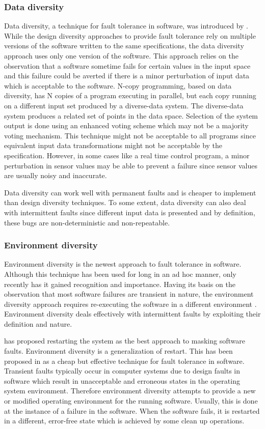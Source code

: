 \documentclass[a4paper, 11pt]{article}
\begin{document}
\subsubsection{Data diversity}
Data diversity, a technique for fault tolerance in software, was introduced by \citet{ammann1988data}. While the design diversity approaches to provide fault tolerance rely on multiple versions of the software written to the same specifications, the data diversity approach uses only one version of the software. This approach relies on the observation that a software sometime fails for certain values in the input space and this failure could be averted if there is a minor perturbation of input data which is acceptable to the software. N-copy programming, based on data diversity, has N copies of a program executing in parallel, but each copy running on a different input set produced by a diverse-data system. The diverse-data system produces a related set of points in the data space. Selection of the system output is done using an enhanced voting scheme which may not be a majority voting mechanism. This technique might not be acceptable to all programs since equivalent input data transformations might not be acceptable by the specification. However, in some cases like a real time control program, a minor perturbation in sensor values may be able to prevent a failure since sensor values are usually noisy and inaccurate.

Data diversity can work well with permanent faults and is cheaper to implement than design diversity techniques. To some extent, data diversity can also deal with intermittent faults since different input data is presented and by definition, these bugs are non-deterministic and non-repeatable.

\subsubsection{Environment diversity}
\label{sec:envdiv}
Environment diversity is the newest approach to fault tolerance in software. Although this technique has been used for long in an ad hoc manner, only recently has it gained recognition and importance. Having its basis on the observation that most software failures are transient in nature, the environment diversity approach requires re-executing the software in a different environment \citep{jalote1995framework}. Environment diversity deals effectively with intermittent faults by exploiting their definition and nature.

\citet{adams1984optimizing} has proposed restarting the system as the best approach to masking software faults. Environment diversity is a generalization of restart. This has been proposed in \citet{huang1994two} as a cheap but effective technique for fault tolerance in software. Transient faults typically occur in computer systems due to design faults in software which result in unacceptable and erroneous states in the operating system environment. Therefore environment diversity attempts to provide a new or modified operating environment for the running software. Usually, this is done at the instance of a failure in the software. When the software fails, it is restarted in a different, error-free state which is achieved by some clean up operations.
\end{document}
